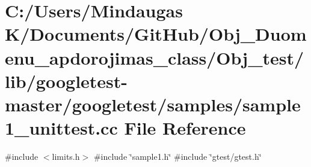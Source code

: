 \hypertarget{_obj__test_2lib_2googletest-master_2googletest_2samples_2sample1__unittest_8cc}{}\section{C\+:/\+Users/\+Mindaugas K/\+Documents/\+Git\+Hub/\+Obj\+\_\+\+Duomenu\+\_\+apdorojimas\+\_\+class/\+Obj\+\_\+test/lib/googletest-\/master/googletest/samples/sample1\+\_\+unittest.cc File Reference}
\label{_obj__test_2lib_2googletest-master_2googletest_2samples_2sample1__unittest_8cc}
{\ttfamily \#include $<$limits.\+h$>$}\newline
{\ttfamily \#include \char`\"{}sample1.\+h\char`\"{}}\newline
{\ttfamily \#include \char`\"{}gtest/gtest.\+h\char`\"{}}\newline
